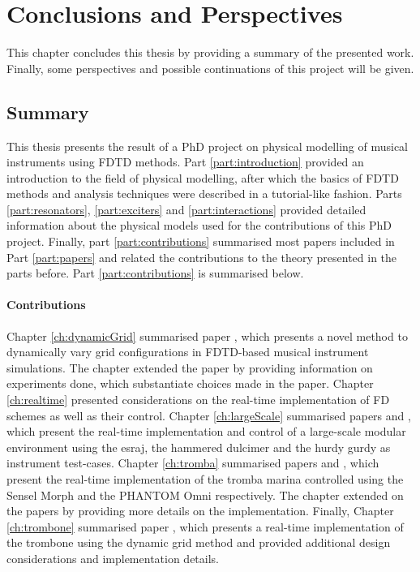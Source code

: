 \chapter{Conclusions and Perspectives}\label{ch:conclusion}
This chapter concludes this thesis by providing a summary of the presented work. Finally, some perspectives and possible continuations of this project will be given.

\section{Summary}
This thesis presents the result of a PhD project on physical modelling of musical instruments using FDTD methods.
Part \ref{part:introduction} provided an introduction to the field of physical modelling, after which the basics of FDTD methods and analysis techniques were described in a tutorial-like fashion. Parts \ref{part:resonators}, \ref{part:exciters} and \ref{part:interactions} provided detailed information about the physical models used for the contributions of this PhD project. Finally, part \ref{part:contributions} summarised most papers included in Part \ref{part:papers} and related the contributions to the theory presented in the parts before. Part \ref{part:contributions} is summarised below.
\subsubsection{Contributions}
Chapter \ref{ch:dynamicGrid} summarised paper \citeP[G], which presents a novel method to dynamically vary grid configurations in FDTD-based musical instrument simulations. The chapter extended the paper by providing information on experiments done, which substantiate choices made in the paper. 
Chapter \ref{ch:realtime} presented considerations on the real-time implementation of FD schemes as well as their control. 
Chapter \ref{ch:largeScale} summarised papers \citeP[A] and \citeP[B], which present the real-time implementation and control of a large-scale modular environment using the esraj, the hammered dulcimer and the hurdy gurdy as instrument test-cases. 
Chapter \ref{ch:tromba} summarised papers \citeP[D] and \citeP[E], which present the real-time implementation of the tromba marina controlled using the Sensel Morph and the PHANTOM Omni respectively. The chapter extended on the papers by providing more details on the implementation. Finally, Chapter \ref{ch:trombone} summarised paper \citeP[H], which presents a real-time implementation of the trombone using the dynamic grid method and provided additional design considerations and implementation details.

